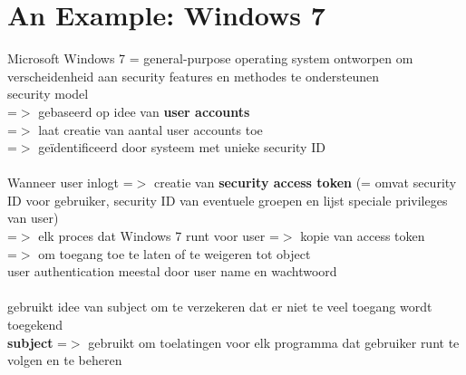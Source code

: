 \documentclass{report}
\begin{document}
\section{An Example: Windows 7}
Microsoft Windows 7 = general-purpose operating system ontworpen om verscheidenheid aan security features en methodes te ondersteunen
\\security model
\\=$>$ gebaseerd op idee van \textbf{user accounts}
\\=$>$ laat creatie van aantal user accounts toe 
\\=$>$ ge\"identificeerd door systeem met unieke security ID
\\
\\Wanneer user inlogt =$>$ creatie van \textbf{security access token} (= omvat security ID voor gebruiker, security ID van eventuele groepen en lijst speciale privileges van user)
\\=$>$ elk proces dat Windows 7 runt voor user =$>$ kopie van access token
\\=$>$ om toegang toe te laten of te weigeren tot object
\\user authentication meestal door user name en wachtwoord
\\
\\gebruikt idee van subject om te verzekeren dat er niet te veel toegang wordt toegekend
\\\textbf{subject} =$>$ gebruikt om toelatingen voor elk programma dat gebruiker runt te volgen en te beheren
\end{document}
